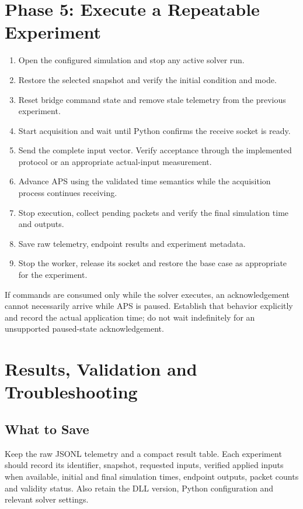 \documentclass[11pt, letterpaper]{article}
\begin{document}
\section{Phase 5: Execute a Repeatable Experiment}
\begin{enumerate}[leftmargin=1.5em,itemsep=0.4em]
\item Open the configured simulation and stop any active solver run.
\item Restore the selected snapshot and verify the initial condition and mode.
\item Reset bridge command state and remove stale telemetry from the previous experiment.
\item Start acquisition and wait until Python confirms the receive socket is ready.
\item Send the complete input vector. Verify acceptance through the implemented protocol or an appropriate actual-input measurement.
\item Advance APS using the validated time semantics while the acquisition process continues receiving.
\item Stop execution, collect pending packets and verify the final simulation time and outputs.
\item Save raw telemetry, endpoint results and experiment metadata.
\item Stop the worker, release its socket and restore the base case as appropriate for the experiment.
\end{enumerate}

If commands are consumed only while the solver executes, an acknowledgement cannot necessarily arrive while APS is paused. Establish that behavior explicitly and record the actual application time; do not wait indefinitely for an unsupported paused-state acknowledgement.

\section{Results, Validation and Troubleshooting}
\subsection{What to Save}
Keep the raw JSONL telemetry and a compact result table. Each experiment should record its identifier, snapshot, requested inputs, verified applied inputs when available, initial and final simulation times, endpoint outputs, packet counts and validity status. Also retain the DLL version, Python configuration and relevant solver settings.
\end{document}

